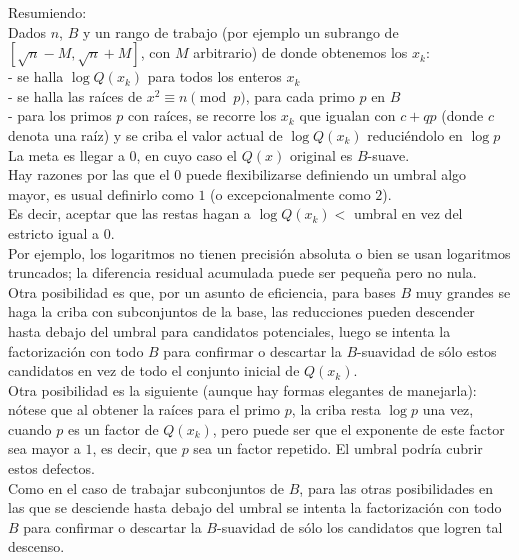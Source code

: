Resumiendo: \\
Dados $n$, $B$ y un rango de trabajo (por ejemplo un subrango de  $[\sqrt n - M, \sqrt n + M]$, con $M$ arbitrario) de donde obtenemos los $x_k$: \\
- se halla $\log Q(x_k)$ para todos los enteros $x_k$ \\
- se halla las raíces de $x^2 \equiv n \pmod p$, para cada primo $p$ en $B$ \\
- para los primos $p$ con raíces, se recorre los $x_k$ que igualan con $c+qp$ (donde $c$ denota una raíz) y se criba el valor actual de $\log Q(x_k)$ reduciéndolo en $\log p$ \\
La meta es llegar a $0$, en cuyo caso el $Q(x)$ original es $B$-suave. \\

Hay razones por las que el $0$ puede flexibilizarse definiendo un umbral algo mayor, es usual definirlo como $1$ (o excepcionalmente como $2$). \\
Es decir, aceptar que las restas hagan a $\log Q(x_k) <$ umbral en vez del estricto igual a $0$. \\
Por ejemplo, los logaritmos no tienen precisión absoluta o bien se usan logaritmos truncados; la diferencia residual acumulada puede ser pequeña pero no nula. \\
Otra posibilidad es que, por un asunto de eficiencia, para bases $B$ muy grandes se haga la criba con subconjuntos de la base, las reducciones pueden descender hasta debajo del umbral para candidatos potenciales, luego se intenta la factorización con todo $B$ para confirmar o descartar la $B$-suavidad de sólo estos candidatos en vez de todo el conjunto inicial de $Q(x_k)$. \\
Otra posibilidad es la siguiente (aunque hay formas elegantes de manejarla): nótese que al  obtener la raíces para el primo $p$, la criba resta $\log p$ una vez, cuando $p$ es un factor de $Q(x_k)$, pero puede ser que el exponente de este factor sea mayor a $1$, es decir, que $p$ sea un factor repetido. El umbral podría cubrir estos defectos. \\
Como en el caso de trabajar subconjuntos de $B$, para las otras posibilidades en las que se desciende hasta debajo del umbral se intenta la factorización con todo $B$ para confirmar o descartar la $B$-suavidad de sólo los candidatos que logren tal descenso. \\

